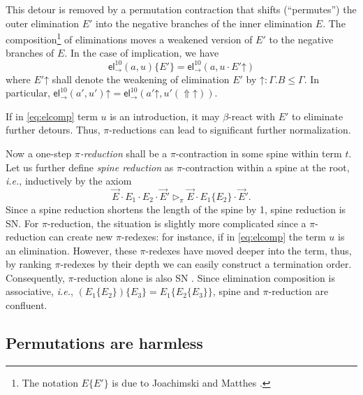 \documentclass[a4paper,USenglish,cleveref, autoref, thm-restate]{lipics-v2019}
\newcommand{\ie}{\emph{i.e.}\xspace}
\newcommand{\tel}{\mathsf{el}}
\newcommand{\el}[2]{\ensuremath{\tel_{#1}^{#2}}}
\newcommand{\contract}[1][]{\mapsto_{#1}}
\newcommand{\whd}[1][]{\rhd_{#1}}
\newcommand{\red}[1][]{\longrightarrow_{#1}}
\newcommand{\Up}{\mathop{\Uparrow}}
\newcommand{\up}{\mathord{\uparrow}}
\begin{document}
This detour is removed by a permutation contraction
\fbox{$E \cdot E' \contract[\pi] E\{E'\}$} that shifts (``permutes'')
the outer elimination
$E'$ into the negative branches of the inner elimination $E$.
The composition\footnote{The notation $E\{E'\}$ is due to Joachimski
  and Matthes \cite{joachimskiMatthes:rta00}.}
 of eliminations moves a weakened
version of $E'$ to the negative branches of $E$.  In the case of
implication, we have
\begin{equation}
  \label{eq:elcomp}
  \el\to{10}(a,u) \{ E' \} = \el\to{10}(a,u \cdot E' \up)
\end{equation}
where
$E' \up$ shall denote the weakening of elimination $E'$ by
$\up : \Gamma.B \leq \Gamma$.
In particular, $\el\to{10}(a',u') \up = \el\to{10}(a' \up, u' (\Up\up))$.

\begin{remark}
  If in \cref{eq:elcomp} term $u$ is an introduction, it may $\beta$-react
  with $E'$ to eliminate further detours.  Thus, $\pi$-reductions can
  lead to significant further normalization.
\end{remark}

Now a one-step \emph{$\pi$-reduction} \fbox{$t \red[\pi] t'$} shall be a
$\pi$-contraction in some spine within term $t$.
%
Let us further define \emph{spine reduction} \fbox{$\vec E \whd[\pi] \vec E'$}
as $\pi$-contraction within a spine at the root, \ie, inductively
by the axiom
\[
  \vec E \cdot E_1 \cdot E_2 \cdot \vec E'
  \whd[\pi]
 \vec E \cdot E_1\{E_2\} \cdot \vec E'
 .
\]
Since a spine reduction shortens the length
of the spine by 1, spine reduction is SN.  For $\pi$-reduction, the
situation is slightly more complicated since a $\pi$-reduction can
create new $\pi$-redexes: for instance, if in \cref{eq:elcomp} the
term $u$ is an elimination.  However, these $\pi$-redexes have moved
deeper into the term, thus, by ranking $\pi$-redexes by their depth we
can easily construct a termination order.  Consequently,
$\pi$-reduction alone is also SN \cite[Thm.~55]{geuversHurkens:types17}.
%
Since elimination composition is associative, \ie,
$(E_1\{E_2\})\{E_3\} = E_1\{E_2\{E_3\}\}$, spine and $\pi$-reduction
are confluent.

\subsection{Permutations are harmless}
\end{document}
